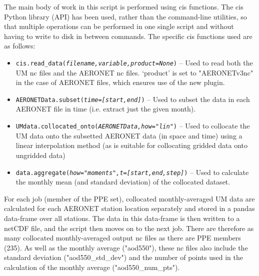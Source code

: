 \documentclass[10pt,a4paper]{article}
\begin{document}
\noindent The main body of work in this script is performed using cis functions. The cis Python library (API) has been used, rather than the command-line utilities, so that multiple operations can be performed in one single script and without having to write to disk in between commands. The specific cis functions used are as  follows:
\begin{itemize}
\item \texttt{cis.read\_data(\textit{filename,variable,product=None})} -- Used to read both the UM nc files and the AERONET nc files. `product' is set to "AERONETv3nc" in the case of AERONET files, which ensures use of the new plugin.
\item \texttt{AERONETData.subset(\textit{time=[start,end]})} -- Used to subset the data in each AERONET file in time (i.e. extract just the given month).
\item \texttt{UMdata.collocated\_onto(\textit{AERONETData,how="lin"})} -- Used to collocate the UM data onto the subsetted AERONET data (in space and time) using a linear interpolation method (as is suitable for collocating gridded data onto ungridded data)
\item \texttt{data.aggregate(\textit{how="moments",t=[start,end,step]})} -- Used to calculate the monthly mean (and standard deviation) of the collocated dataset.
\end{itemize}
For each job (member of the PPE set), collocated monthly-averaged UM data are calculated for each AERONET station location separately and stored in a pandas data-frame over all stations. The data in this data-frame is then written to a netCDF file, and the script then moves on to the next job. There are therefore as many collocated monthly-averaged output nc files as there are PPE members (235). As well as the monthly average ("aod550"), these nc files also include the standard deviation ("aod550\_std\_dev") and the number of points used in the calculation of the monthly average ("aod550\_num\_pts").
\end{document}
